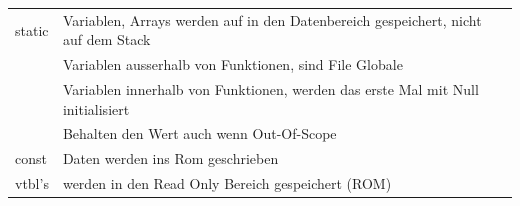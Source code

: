 \begin{tabular}{l|l}
\hline
   static   & Variablen, Arrays werden auf in den Datenbereich gespeichert, nicht auf dem Stack\\
            & Variablen ausserhalb von Funktionen, sind File Globale\\
            & Variablen innerhalb von Funktionen, werden das erste Mal mit Null initialisiert\\
            &  Behalten den Wert auch wenn Out-Of-Scope\\ \hline
    const   & Daten werden ins Rom geschrieben \\
    vtbl's  & werden in den Read Only Bereich gespeichert (ROM)
\end{tabular}\\

